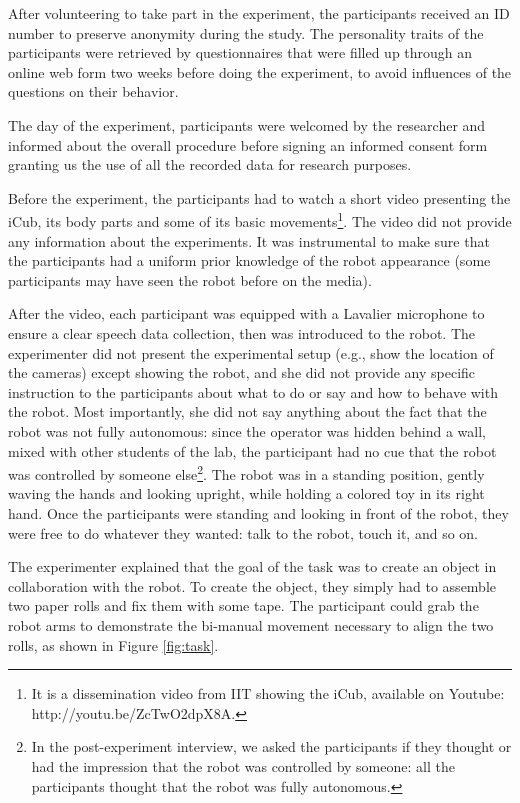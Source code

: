 After volunteering to take part in the experiment, the participants received an ID number to preserve anonymity during the study. 
The personality traits of the participants were retrieved by questionnaires that were filled up through an online web form two weeks before doing the experiment, to avoid influences of the questions on their behavior.

The day of the experiment, participants were welcomed by the researcher and informed about the overall procedure before signing an informed consent form granting us the use of all the recorded data for research purposes.

Before the experiment, the participants had to watch a short video presenting the iCub, its body parts and some of its basic movements\footnote{It is a dissemination video from IIT showing the iCub, available on Youtube: {http://youtu.be/ZcTwO2dpX8A}.}. The video did not provide any information about the experiments. It was instrumental to make sure that the participants had a uniform prior knowledge of the robot appearance (some participants may have seen the robot before on the media).


After the video, each participant was equipped with a Lavalier microphone to ensure a clear speech data collection, then was introduced to the robot.
The experimenter did not present the experimental setup (e.g., show the location of the cameras) except showing the robot, and she did not provide any specific instruction to the participants about what to do or say and how to behave with the robot. 
Most importantly, she did not say anything about the 
fact that the robot was not fully autonomous:
since the operator was hidden behind a wall, mixed with other students of the lab, the participant had no cue that the robot was controlled by someone else\footnote{In the post-experiment interview, we asked the participants if they thought or had the impression that the robot was controlled by someone: all the participants thought that the robot was fully autonomous.}.
The robot was in a standing position, gently waving the hands and looking upright, while holding a colored toy in its right hand. 
Once the participants were standing and looking in front of the robot, they were free to do whatever they wanted: talk to the robot, touch it, and so on. 

The experimenter explained that the goal of the task was to create an object in collaboration with the robot.
To create the object, they simply had to assemble two paper rolls and fix them with some tape.
The participant could grab the robot arms to demonstrate the bi-manual movement necessary to align the two rolls, as shown in Figure \ref{fig:task}. 

